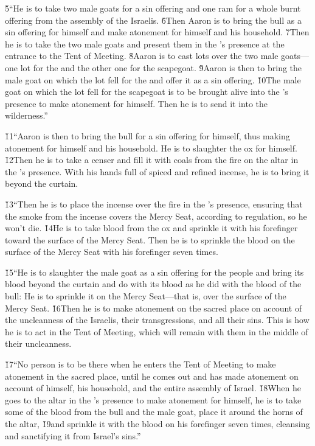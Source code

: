 \v{5}``He is to take two male goats for a sin offering and one ram for a whole burnt offering from the assembly of the Israelis. \v{6}Then Aaron is to bring the bull as a sin offering for himself and make atonement for himself and his household. \v{7}Then he is to take the two male goats and present them in the 's presence at the entrance to the Tent of Meeting. \v{8}Aaron is to cast lots over the two male goats---one lot for the  and the other one for the scapegoat. \v{9}Aaron is then to bring the male goat on which the lot fell for the  and offer it as a sin offering. \v{10}The male goat on which the lot fell for the scapegoat is to be brought alive into the 's presence to make atonement for himself. Then he is to send it into the wilderness.''

\v{11}``Aaron is then to bring the bull for a sin offering for himself, thus making atonement for himself and his household. He is to slaughter the ox for himself. \v{12}Then he is to take a censer and fill it with coals from the fire on the altar in the 's presence. With his hands full of spiced and refined incense, he is to bring it beyond the curtain.

\v{13}``Then he is to place the incense over the fire in the 's presence, ensuring that the smoke from the incense covers the Mercy Seat, according to regulation, so he won't die. \v{14}He is to take blood from the ox and sprinkle it with his forefinger toward the surface of the Mercy Seat. Then he is to sprinkle the blood on the surface of the Mercy Seat with his forefinger seven times.

\v{15}``He is to slaughter the male goat as a sin offering for the people and bring its blood beyond the curtain and do with its blood as he did with the blood of the bull: He is to sprinkle it on the Mercy Seat---that is, over the surface of the Mercy Seat. \v{16}Then he is to make atonement on the sacred place on account of the uncleanness of the Israelis, their transgressions, and all their sins. This is how he is to act in the Tent of Meeting, which will remain with them in the middle of their uncleanness.

\v{17}``No person is to be there when he enters the Tent of Meeting to make atonement in the sacred place, until he comes out and has made atonement on account of himself, his household, and the entire assembly of Israel. \v{18}When he goes to the altar in the 's presence to make atonement for himself, he is to take some of the blood from the bull and the male goat, place it around the horns of the altar, \v{19}and sprinkle it with the blood on his forefinger seven times, cleansing and sanctifying it from Israel's sins.''

